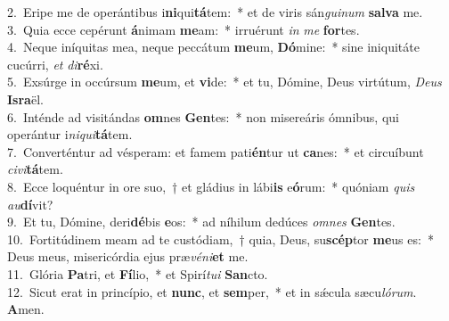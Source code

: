 {2.~}Eripe me de operántibus i\textbf{ni}qui\textbf{tá}tem:~* et de viris sán\textit{gui}\textit{num} \textbf{sal}\textbf{va} me.\\
{3.~}Quia ecce cepérunt \textbf{á}nimam \textbf{me}am:~* irruérunt \textit{in} \textit{me} \textbf{for}tes.\\
{4.~}Neque iníquitas mea, neque peccátum \textbf{me}um, \textbf{Dó}mine:~* sine iniquitáte cucúrri, \textit{et} \textit{di}\textbf{ré}xi.\\
{5.~}Exsúrge in occúrsum \textbf{me}um, et \textbf{vi}de:~* et tu, Dómine, Deus virtútum, \textit{De}\textit{us} \textbf{Is}\textbf{ra}ël.\\
{6.~}Inténde ad visitándas \textbf{om}nes \textbf{Gen}tes:~* non misereáris ómnibus, qui operántur i\textit{ni}\textit{qui}\textbf{tá}tem.\\
{7.~}Converténtur ad vésperam: et famem pati\textbf{én}tur ut \textbf{ca}nes:~* et circuíbunt \textit{ci}\textit{vi}\textbf{tá}tem.\\
{8.~}Ecce loquéntur in ore suo,~† et gládius in lábi\textbf{is} e\textbf{ó}rum:~* quóniam \textit{quis} \textit{au}\textbf{dí}vit?\\
{9.~}Et tu, Dómine, deri\textbf{dé}bis \textbf{e}os:~* ad níhilum dedúces \textit{om}\textit{nes} \textbf{Gen}tes.\\
{10.~}Fortitúdinem meam ad te custódiam,~† quia, Deus, su\textbf{scép}tor \textbf{me}us es:~* Deus meus, misericórdia ejus præ\textit{vé}\textit{ni}\textbf{et} me.\\
{11.~}Glória \textbf{Pa}tri, et \textbf{Fí}lio,~* et Spirí\textit{tu}\textit{i} \textbf{San}cto.\\
{12.~}Sicut erat in princípio, et \textbf{nunc}, et \textbf{sem}per,~* et in sǽcula sæcu\textit{ló}\textit{rum}. \textbf{A}men.\\
